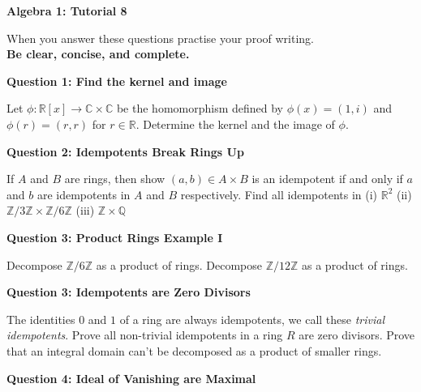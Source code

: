 \documentclass[11pt,twoside, a4paper]{report}
\theoremstyle{plain}
\theoremstyle{definition}
\begin{document}
\begin{center}
 \noindent\makebox[\linewidth]{\rule{14cm}{1.5pt}} 
{\bf Algebra 1: Tutorial 8 }
 \noindent\makebox[\linewidth]{\rule{14cm}{1.5pt}}  
 \noindent\makebox[\linewidth]{\rule{14cm}{3pt}}
\end{center}

\noindent When you answer these questions practise your proof writing.\\
  {\bf Be clear, concise, and complete.}
  
  \begin{center}
{\bf Question 1: Find the kernel and image}
\end{center} 

Let $\phi: \mathbb{R}[x] \rightarrow \mathbb{C} \times \mathbb{C}$ be the homomorphism defined by $\phi(x) = (1, i)$ and $\phi(r) = (r,r)$ for $r \in \mathbb{R}$. Determine the kernel and the image of $\phi$. 

\begin{center}
{\bf Question 2: Idempotents Break Rings Up}
\end{center} 

If $A$ and $B$ are rings, then show $(a,b) \in A\times B$ is an idempotent if and only if $a$ and $b$ are idempotents in $A$ and $B$ respectively. Find all idempotents in (i) $\mathbb{R}^{2}$ (ii) $\mathbb{Z}/3\mathbb{Z} \times \mathbb{Z}/6\mathbb{Z}$ (iii) $\mathbb{Z}\times\mathbb{Q}$


\begin{center}
{\bf Question 3: Product Rings Example I}
\end{center}

Decompose $\mathbb{Z}/6\mathbb{Z}$ as a product of rings. Decompose $\mathbb{Z}/12\mathbb{Z}$ as a product of rings. 



\begin{center}
{\bf Question 3: Idempotents are Zero Divisors}
\end{center}

The identities $0$ and $1$ of a ring are always idempotents, we call these \emph{trivial idempotents}. Prove all non-trivial idempotents in a ring $R$ are zero divisors. Prove that an integral domain can't be decomposed as a product of smaller rings. 


\begin{center}
{\bf Question 4: Ideal of Vanishing are Maximal}
\end{center}
\end{document}
